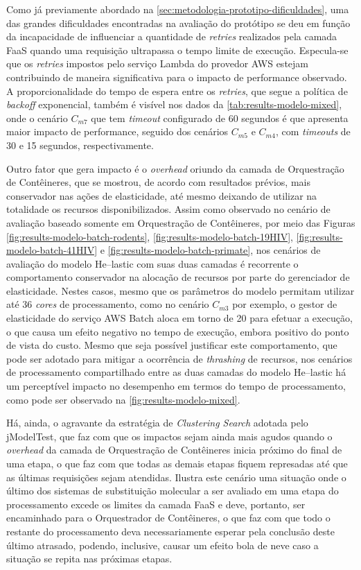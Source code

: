 \documentclass[english,brazilian]{UNISINOSmonografia} %
\begin{document}
Como já previamente abordado na \autoref{sec:metodologia-prototipo-dificuldades}, uma das grandes dificuldades encontradas na avaliação do protótipo se deu em função da incapacidade de influenciar a quantidade de \textit{retries} realizados pela camada FaaS quando uma requisição ultrapassa o tempo limite de execução.
%
Especula-se que os \textit{retries} impostos pelo serviço Lambda do provedor AWS estejam contribuindo de maneira significativa para o impacto de performance observado.
%
A proporcionalidade do tempo de espera entre os \textit{retries}, que segue a política de \textit{backoff} exponencial, também é visível nos dados da \autoref{tab:results-modelo-mixed}, onde o cenário $C_{m7}$ que tem \textit{timeout} configurado de 60 segundos é que apresenta maior impacto de performance, seguido dos cenários $C_{m5}$ e $C_{m4}$, com \textit{timeouts} de 30 e 15 segundos, respectivamente.



Outro fator que gera impacto é o \textit{overhead} oriundo da camada de Orquestração de Contêineres, que se mostrou, de acordo com resultados prévios, mais conservador nas ações de elasticidade, até mesmo deixando de utilizar na totalidade os recursos disponibilizados.
%
Assim como observado no cenário de avaliação baseado somente em Orquestração de Contêineres, por meio das Figuras \ref{fig:results-modelo-batch-rodents}, \ref{fig:results-modelo-batch-19HIV}, \ref{fig:results-modelo-batch-41HIV} e \ref{fig:results-modelo-batch-primate}, nos cenários de avaliação do modelo \textsf{He}--lastic com suas duas camadas é recorrente o comportamento conservador na alocação de recursos por parte do gerenciador de elasticidade.
%
Nestes casos, mesmo que os parâmetros do modelo permitam utilizar até 36 \textit{cores} de processamento, como no cenário $C_{m3}$ por exemplo, o gestor de elasticidade do serviço AWS Batch aloca em torno de 20 para efetuar a execução, o que causa um efeito negativo no tempo de execução, embora positivo do ponto de vista do custo.
%
Mesmo que seja possível justificar este comportamento, que pode ser adotado para mitigar a ocorrência de \textit{thrashing} de recursos, nos cenários de processamento compartilhado entre as duas camadas do modelo \textsf{He}--lastic há um perceptível impacto no desempenho em termos do tempo de processamento, como pode ser observado na \autoref{fig:results-modelo-mixed}.




Há, ainda, o agravante da estratégia de \textit{Clustering Search} adotada pelo jModelTest, que faz com que os impactos sejam ainda mais agudos quando o \textit{overhead} da camada de Orquestração de Contêineres inicia próximo do final de uma etapa, o que faz com que todas as demais etapas fiquem represadas até que as últimas requisições sejam atendidas.
%
Ilustra este cenário uma situação onde o último dos sistemas de substituição molecular a ser avaliado em uma etapa do processamento excede os limites da camada FaaS e deve, portanto, ser encaminhado para o Orquestrador de Contêineres, o que faz com que todo o restante do processamento deva necessariamente esperar pela conclusão deste último atrasado, podendo, inclusive, causar um efeito bola de neve caso a situação se repita nas próximas etapas.
\end{document}
